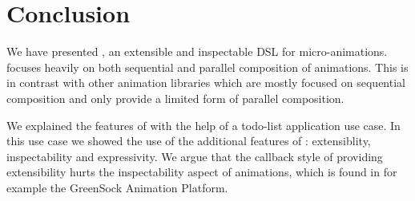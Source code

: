 \section{Conclusion}
\label{sec:conclusion}

We have presented \dsl{}, an extensible and inspectable DSL for micro-animations. \dsl{} focuses heavily on both sequential and parallel composition of animations. This is in contrast with other animation libraries which are mostly focused on sequential composition and only provide a limited form of parallel composition.

We explained the features of \dsl{} with the help of a todo-list application use case. In this use case we showed the use of the additional features of \dsl{}: extensiblity, inspectability and expressivity. We argue that the callback style of providing extensibility hurts the inspectability aspect of animations, which is found in for example the GreenSock Animation Platform.
